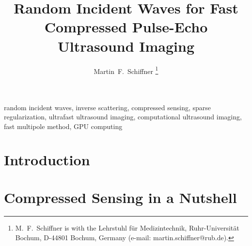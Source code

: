 \documentclass[10pt,twocolumn,romanappendices,final]{IEEEtran}
\title{Random Incident Waves for Fast Compressed Pulse-Echo Ultrasound Imaging}
\author{%
Martin~F.~Schiffner%
\thanks{M.~F.~Schiffner is with the Lehrstuhl für Medizintechnik, Ruhr-Universität Bochum, D-44801 Bochum, Germany (e-mail: martin.schiffner@rub.de).}%
}
\begin{document}
\maketitle

\begin{abstract}
  \boldmath
  
\end{abstract}
\acresetall

\begin{IEEEkeywords}
  random incident waves,
  inverse scattering,
  compressed sensing,
  sparse regularization,
  ultrafast ultrasound imaging,
  computational ultrasound imaging,
  fast multipole method,
  \acs{GPU} computing
\end{IEEEkeywords}

\section{Introduction}
\label{sec:introduction}


\section{Compressed Sensing in a Nutshell}
\label{sec:compressed_sensing}

\end{document}
